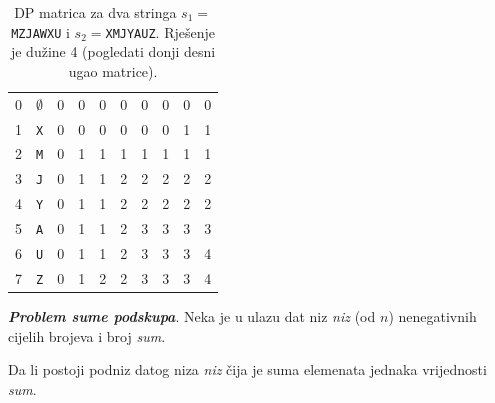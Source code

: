 \begin{solution}
\begin{table}
\begin{tabular}{cc|cccccccc}
     	  	0&$\emptyset$ &0& 0& 0&  0&0 &0 & 0   & 0 	   \\
     	  	1& \texttt{X}& 0& 0& 0& 0& 0& 0&  1  & 1                \\	
     	  	2& \texttt{M}& 0& 1& 1& 1& 1& 1&  1  & 1                \\	
     	  	3& \texttt{J}& 0& 1& 1& 2& 2& 2&  2  & 2                \\	
     	  	4& \texttt{Y}&0 & 1& 1& 2& 2& 2&  2  & 2                 \\	
      	  	5& \texttt{A}& 0& 1& 1& 2& 3& 3&  3  & 3                \\	
      	  	6& \texttt{U}& 0& 1& 1& 2& 3& 3&  3  & 4                \\	
      	  	7& \texttt{Z}& 0& 1& 2& 2& 3& 3&  3  & 4                \\	 \hline \hline
     	  \end{tabular}
 	 \caption{DP matrica za dva stringa $s_1=$\texttt{MZJAWXU} i $s_2=$\texttt{XMJYAUZ}. Rješenje je dužine 4 (pogledati donji desni ugao matrice). }  \label{tab:dp-lcs-example} 
 	\end{table}
\end{solution}


\begin{example}
	\textbf{\textit{Problem sume podskupa}}. Neka je u ulazu dat niz \emph{niz} (od $n$) nenegativnih cijelih brojeva i broj \textit{sum}. 
	
	Da li postoji podniz datog niza \emph{niz} čija je suma elemenata
	  jednaka vrijednosti  \textit{sum}.
\end{example}

